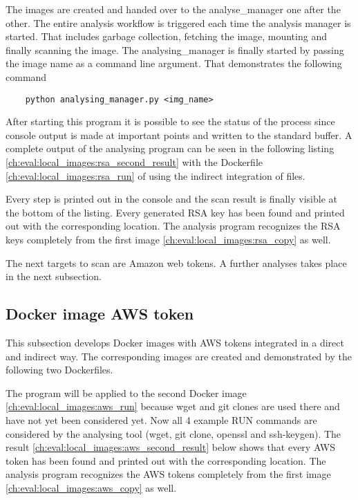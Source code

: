 The images are created and handed over to the analyse\_manager one after the other. The entire analysis workflow is triggered each time the analysis manager is started. That includes garbage collection, fetching the image, mounting and finally scanning the image.
The analysing\_manager is finally started by passing the image name as a command line argument. That demonstrates the following command
\begin{lstlisting}
	python analysing_manager.py <img_name>
\end{lstlisting}
After starting this program it is possible to see the status of the process since console output is made at important points and written to the standard buffer.
A complete output of the analysing program can be seen in the following listing \ref{ch:eval:local_images:rsa_second_result} with the Dockerfile \ref{ch:eval:local_images:rsa_run} of using the indirect integration of files.

Every step is printed out in the console and the scan result is finally visible at the bottom of the listing. Every generated RSA key has been found and printed out with the corresponding location. The analysis program recognizes the RSA keys completely from the first image \ref{ch:eval:local_images:rsa_copy} as well. 

The next targets to scan are Amazon web tokens. A further analyses takes place in the next subsection.

\subsection{Docker image AWS token}
\label{ch:eval:local_images:aws}
This subsection develops Docker images with AWS tokens integrated in a direct and indirect way. The corresponding images are created and demonstrated by the following two Dockerfiles.


The program will be applied to the second Docker image \ref{ch:eval:local_images:aws_run} because wget and git clones are used there and have not yet been considered yet.
Now all 4 example RUN commands are considered by the analysing tool (wget, git clone, openssl and ssh-keygen). The result \ref{ch:eval:local_images:aws_second_result} below shows that every AWS token has been found and printed out with the corresponding location. The analysis program recognizes the AWS tokens completely from the first image \ref{ch:eval:local_images:aws_copy} as well. 



